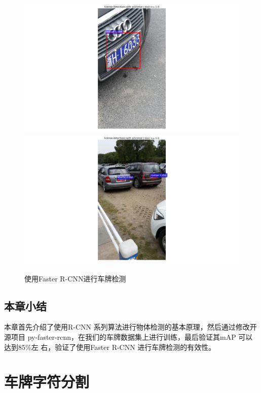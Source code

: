 \begin{figure}[th]
\centering
{}
{\includegraphics[width=1\linewidth, keepaspectratio]{./Figure/DetectionDemo.png}}
{\includegraphics[width=1\linewidth, keepaspectratio]{./Figure/DetectionDemo2.png}}
\caption{使用Faster R-CNN进行车牌检测}\label{Fig:DetectionDemo}
\end{figure}

\section{本章小结}

本章首先介绍了使用R-CNN 系列算法进行物体检测的基本原理，然后通过修改开源项目
py-faster-rcnn，在我们的车牌数据集上进行训练，最后验证其mAP 可以达到85\%左
右，验证了使用Faster R-CNN 进行车牌检测的有效性。

\chapter{车牌字符分割}

